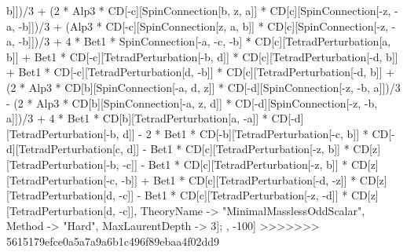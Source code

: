 b]])/3 + (2 * Alp3 * CD[-c][SpinConnection[b, z, a]] * CD[c][SpinConnection[-z, -a, -b]])/3 + (Alp3 * CD[-c][SpinConnection[z, a, b]] * CD[c][SpinConnection[-z, -a, -b]])/3 + 4 * Bet1 * SpinConnection[-a, -c, -b] * CD[c][TetradPerturbation[a, b]] + Bet1 * CD[-c][TetradPerturbation[-b, d]] * CD[c][TetradPerturbation[-d, b]] + Bet1 * CD[-c][TetradPerturbation[d, -b]] * CD[c][TetradPerturbation[-d, b]] + (2 * Alp3 * CD[b][SpinConnection[-a, d, z]] * CD[-d][SpinConnection[-z, -b, a]])/3 - (2 * Alp3 * CD[b][SpinConnection[-a, z, d]] * CD[-d][SpinConnection[-z, -b, a]])/3 + 4 * Bet1 * CD[b][TetradPerturbation[a, -a]] * CD[-d][TetradPerturbation[-b, d]] - 2 * Bet1 * CD[-b][TetradPerturbation[-c, b]] * CD[-d][TetradPerturbation[c, d]] - Bet1 * CD[c][TetradPerturbation[-z, b]] * CD[z][TetradPerturbation[-b, -c]] - Bet1 * CD[c][TetradPerturbation[-z, b]] * CD[z][TetradPerturbation[-c, -b]] + Bet1 * CD[c][TetradPerturbation[-d, -z]] * CD[z][TetradPerturbation[d, -c]] - Bet1 * CD[c][TetradPerturbation[-z, -d]] * CD[z][TetradPerturbation[d, -c]], TheoryName -> "MinimalMasslessOddScalar", Method -> "Hard", MaxLaurentDepth -> 3]; , -100]
>>>>>>> 5615179efce0a5a7a9a6b1c496f89ebaa4f02dd9
